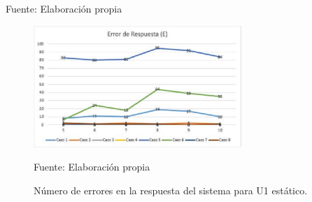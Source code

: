 \begin{center}
\begin{table}[H]
\centering
\caption{\small{Resultados para el caso 6 con U1 estático.}}
\label{table:tabla4.31}
\begin{center}
\vskip 0.2cm
{\small{Fuente: Elaboración propia}}
\end{center}
\end{table}
\end{center}


\begin{figure}[H]
\begin{center}
\includegraphics[width=0.7\textwidth]{Imagenes/Cap4/image009}
\end{center}
\begin{center}
\vskip -0.5cm
\caption{\small{Número de errores en la respuesta del sistema para U1 estático.}}
\label{fig:figura4.9}
{\small{Fuente: Elaboración propia}}
\end{center}
\end{figure}

\vskip -0.5cm

